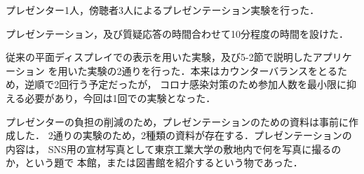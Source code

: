 









プレゼンター1人，傍聴者3人によるプレゼンテーション実験を行った．

プレゼンテーション，及び質疑応答の時間合わせて10分程度の時間を設けた．

従来の平面ディスプレイでの表示を用いた実験，及び5-2節で説明したアプリケーション
を用いた実験の2通りを行った．本来はカウンターバランスをとるため，逆順で2回行う予定だったが，
コロナ感染対策のため参加人数を最小限に抑える必要があり，今回は1回での実験となった．

プレゼンターの負担の削減のため，プレゼンテーションのための資料は事前に作成した．
2通りの実験のため，2種類の資料が存在する．プレゼンテーションの内容は，
SNS用の宣材写真として東京工業大学の敷地内で何を写真に撮るのか，という題で
本館，または図書館を紹介するという物であった．


